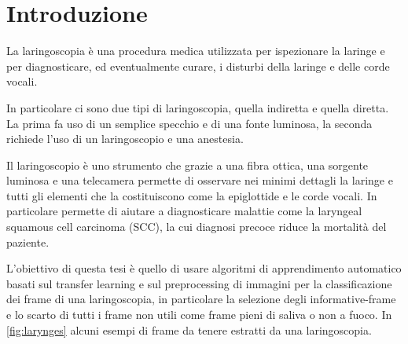\chapter{Introduzione}\label{introduzione}

La laringoscopia è una procedura medica utilizzata per ispezionare la laringe e per diagnosticare, ed eventualmente curare, i disturbi della laringe e delle corde vocali.

In particolare ci sono due tipi di laringoscopia, quella indiretta e quella diretta. La prima fa uso di un semplice specchio e di una fonte luminosa, la seconda richiede l'uso di un laringoscopio e una anestesia.

Il laringoscopio è uno strumento che grazie a una fibra ottica, una sorgente luminosa e una telecamera permette di osservare nei minimi dettagli la laringe e tutti gli elementi che la costituiscono come la epiglottide e le corde vocali\cite{giorgio_cenni_2008}. In particolare permette di aiutare a diagnosticare malattie come la laryngeal squamous cell carcinoma (SCC), la cui diagnosi precoce riduce la mortalità del paziente\cite{moccia_larynge}.

L'obiettivo di questa tesi è quello di usare algoritmi di apprendimento automatico basati sul transfer learning e sul  preprocessing di immagini  per la classificazione dei frame di una laringoscopia, in particolare la selezione degli informative-frame e lo scarto di tutti i frame non utili come frame pieni di saliva o non a fuoco. In \cref{fig:larynges} alcuni esempi di frame da tenere estratti da una laringoscopia.

